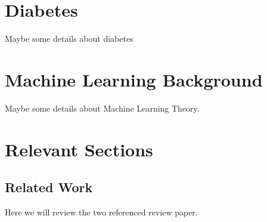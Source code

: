 \documentclass[journal,article,submit,pdftex,moreauthors]{Definitions/mdpi}
\begin{document}
\section{Diabetes}
Maybe some details about diabetes
\section{Machine Learning Background}
Maybe some details about Machine Learning Theory.
\section{Relevant Sections}
\subsection{Related Work}
Here we will review the two referenced review paper.
\end{document}
